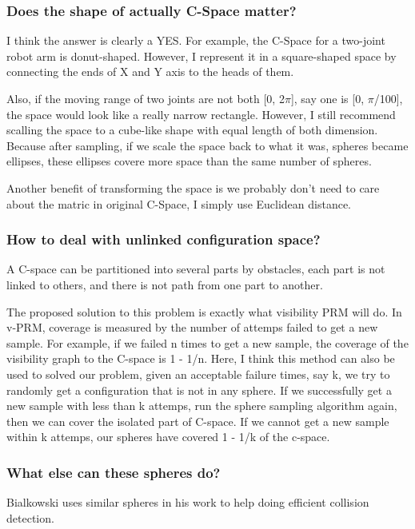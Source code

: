 \documentclass{article}
\begin{document}
    \subsubsection{Does the shape of actually C-Space matter? }
      I think the answer is clearly a YES. For example, the C-Space for a two-joint robot arm is donut-shaped. However, I represent it in a square-shaped space by connecting the ends of X and Y axis to the heads of them. 

      Also, if the moving range of two joints are not both [0, 2$\pi$], say one is [0, $\pi$/100], the space would look like a really narrow rectangle. However, I still recommend scalling the space to a cube-like shape with equal length of both dimension. Because after sampling, if we scale the space back to what it was, spheres became ellipses, these ellipses covere more space than the same number of spheres. 

      Another benefit of transforming the space is we probably don't need to care about the matric in original C-Space, I simply use Euclidean distance. 

    \subsubsection{How to deal with unlinked configuration space?}
      A C-space can be partitioned into several parts by obstacles, each part is not linked to others, and there is not path from one part to another. 

      The proposed solution to this problem is exactly what visibility PRM will do. In v-PRM, coverage is measured by the number of attemps failed to get a new sample. For example, if we failed n times to get a new sample, the coverage of the visibility graph to the C-space is 1 - 1/n. Here, I think this method can also be used to solved our problem, given an acceptable failure times, say k, we try to randomly get a configuration that is not in any sphere. If we successfully get a new sample with less than k attemps, run the sphere sampling algorithm again, then we can cover the isolated part of C-space. If we cannot get a new sample within k attemps, our spheres have covered 1 - 1/k of the c-space. 

    \subsubsection{What else can these spheres do?}
      Bialkowski uses similar spheres in his work \cite{Bialkowski2012} to help doing efficient collision detection.
\end{document}
